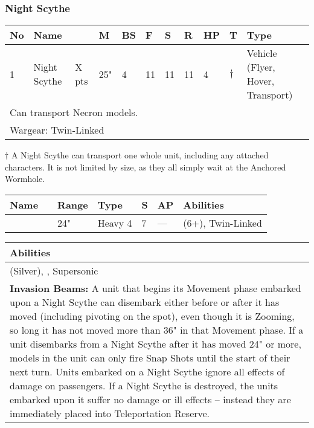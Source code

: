 \newpage
\subsubsection{Night Scythe}

\noindent
\begin{tabular}{||m{10pt} m{95pt} m{30pt} m{11pt} m{11pt} m{11pt} m{11pt} m{11pt} m{11pt} m{11pt} m{200pt}||}
	\hline
	No & Name & & M & BS & F & S & R & HP & T & Type \\
	\hline
	1 & Night Scythe & X pts & 25" & 4 & 11 & 11 & 11 & 4 & $\dagger$ & Vehicle (Flyer, Hover, Transport) \\
	\hline
	\hline
	\multicolumn{11}{||Z{532 pt}||}{Can transport Necron models.}\\		
	\hline
	\hline
	\multicolumn{11}{||Z{532 pt}||}{Wargear: Twin-Linked \quickref{Tesla Destructor}}\\
	\hline
\end{tabular}
\begin{tablenotes}
\item{ $\dagger$ A Night Scythe can transport one whole unit, including any attached characters. It is not limited by size, as they all simply wait at the Anchored Wormhole.}
\end{tablenotes}

\noindent
\begin{tabular}{||m{110pt} m{30pt} m{31pt} m{55pt} m{12pt} m{12pt} m{210pt}||}
	\hline
	Name & & Range & Type & S & AP & Abilities \\
	\hline
	\quickref{Tesla Destructor} & & 24" & Heavy 4 & 7 & — & \quickref{Tesla} (6+), Twin-Linked\\
	\hline
\end{tabular}


\noindent
\begin{tabular}{||m{532pt}||}
	\hline
	Abilities \\
	\hline
	\quickref{Awakening Protocols} (Silver), \quickref{Living Metal}, Supersonic\\
	\textbf{Invasion Beams:} A unit that begins its Movement phase embarked upon a Night Scythe can disembark either before or after it has moved (including pivoting on the spot), even though it is Zooming, so long it has not moved more than 36" in that Movement phase. If a unit disembarks from a Night Scythe after it has moved 24" or more, models in the unit can only fire Snap Shots until the start of their next turn. Units
	embarked on a Night Scythe ignore all effects of damage on passengers. If a Night Scythe is destroyed, the units embarked upon it suffer no damage or ill effects – instead they are immediately placed into Teleportation Reserve. \\
	\hline
\end{tabular}


